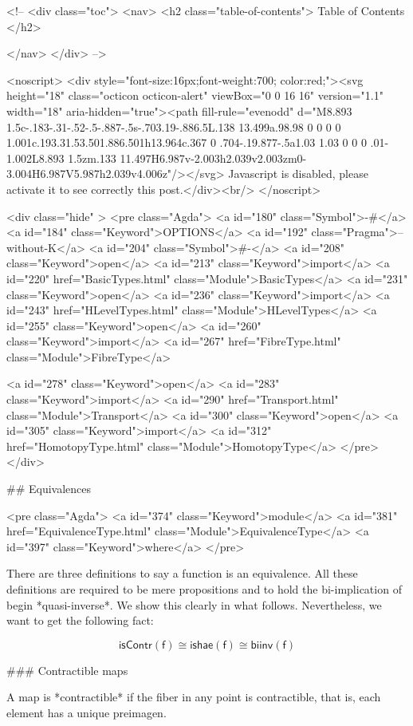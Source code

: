   <!-- 
  <div class="toc">
    <nav>
    <h2 class="table-of-contents"> Table of Contents </h2>
      

    </nav>
  </div>
   -->

  <noscript>
  <div style="font-size:16px;font-weight:700; color:red;"><svg height="18" class="octicon octicon-alert" viewBox="0 0 16 16" version="1.1" width="18" aria-hidden="true"><path fill-rule="evenodd" d="M8.893 1.5c-.183-.31-.52-.5-.887-.5s-.703.19-.886.5L.138 13.499a.98.98 0 0 0 0 1.001c.193.31.53.501.886.501h13.964c.367 0 .704-.19.877-.5a1.03 1.03 0 0 0 .01-1.002L8.893 1.5zm.133 11.497H6.987v-2.003h2.039v2.003zm0-3.004H6.987V5.987h2.039v4.006z"/></svg> Javascript is disabled, please activate it to see correctly this post.</div><br/>
  </noscript>

  <div class="hide" >
<pre class="Agda">
<a id="180" class="Symbol">{-#</a> <a id="184" class="Keyword">OPTIONS</a> <a id="192" class="Pragma">--without-K</a> <a id="204" class="Symbol">#-}</a>
<a id="208" class="Keyword">open</a> <a id="213" class="Keyword">import</a> <a id="220" href="BasicTypes.html" class="Module">BasicTypes</a>
<a id="231" class="Keyword">open</a> <a id="236" class="Keyword">import</a> <a id="243" href="HLevelTypes.html" class="Module">HLevelTypes</a>
<a id="255" class="Keyword">open</a> <a id="260" class="Keyword">import</a> <a id="267" href="FibreType.html" class="Module">FibreType</a>

<a id="278" class="Keyword">open</a> <a id="283" class="Keyword">import</a> <a id="290" href="Transport.html" class="Module">Transport</a>
<a id="300" class="Keyword">open</a> <a id="305" class="Keyword">import</a> <a id="312" href="HomotopyType.html" class="Module">HomotopyType</a>
</pre>
</div>

## Equivalences

<pre class="Agda">
<a id="374" class="Keyword">module</a> <a id="381" href="EquivalenceType.html" class="Module">EquivalenceType</a> <a id="397" class="Keyword">where</a>
</pre>

There are three definitions to say a function is an
equivalence. All these definitions
are required to be mere propositions and to hold
the bi-implication of begin *quasi-inverse*. We show
this clearly in what follows. Nevertheless, we want to get
the following fact:

$$ \mathsf{isContr(f)} \cong \mathsf{ishae(f)} \cong \mathsf{biinv(f)} $$

### Contractible maps

A map is *contractible* if the fiber in any point is contractible, that is, each
element has a unique preimagen.


